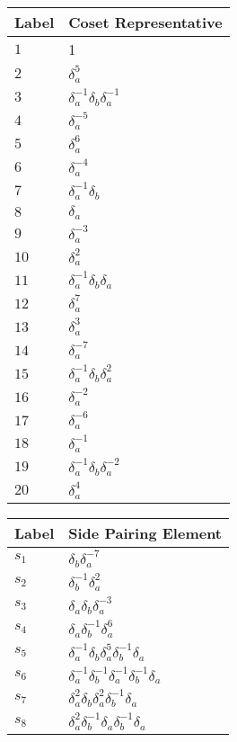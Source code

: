 \documentclass{article}
\begin{document}
\begin{center}
\begin{tabular}{ll}
\toprule
Label & Coset Representative\\
\midrule
$1$ & 1 \\
$2$ & $\delta_a^{5}$ \\
$3$ & $\delta_a^{-1}\delta_b^{}\delta_a^{-1}$ \\
$4$ & $\delta_a^{-5}$ \\
$5$ & $\delta_a^{6}$ \\
$6$ & $\delta_a^{-4}$ \\
$7$ & $\delta_a^{-1}\delta_b^{}$ \\
$8$ & $\delta_a^{}$ \\
$9$ & $\delta_a^{-3}$ \\
$10$ & $\delta_a^{2}$ \\
$11$ & $\delta_a^{-1}\delta_b^{}\delta_a^{}$ \\
$12$ & $\delta_a^{7}$ \\
$13$ & $\delta_a^{3}$ \\
$14$ & $\delta_a^{-7}$ \\
$15$ & $\delta_a^{-1}\delta_b^{}\delta_a^{2}$ \\
$16$ & $\delta_a^{-2}$ \\
$17$ & $\delta_a^{-6}$ \\
$18$ & $\delta_a^{-1}$ \\
$19$ & $\delta_a^{-1}\delta_b^{}\delta_a^{-2}$ \\
$20$ & $\delta_a^{4}$ \\
\bottomrule
\end{tabular}
\hfill
\begin{tabular}{ll}
\toprule
Label & Side Pairing Element\\
\midrule
$s_{1}$ & $\delta_b^{}\delta_a^{-7}$ \\
$s_{2}$ & $\delta_b^{-1}\delta_a^{2}$ \\
$s_{3}$ & $\delta_a^{}\delta_b^{}\delta_a^{-3}$ \\
$s_{4}$ & $\delta_a^{}\delta_b^{-1}\delta_a^{6}$ \\
$s_{5}$ & $\delta_a^{-1}\delta_b^{}\delta_a^{5}\delta_b^{-1}\delta_a^{}$ \\
$s_{6}$ & $\delta_a^{-1}\delta_b^{-1}\delta_a^{-1}\delta_b^{-1}\delta_a^{}$ \\
$s_{7}$ & $\delta_a^{2}\delta_b^{}\delta_a^{2}\delta_b^{-1}\delta_a^{}$ \\
$s_{8}$ & $\delta_a^{2}\delta_b^{-1}\delta_a^{}\delta_b^{-1}\delta_a^{}$ \\

\end{tabular}
\end{center}
\end{document}
